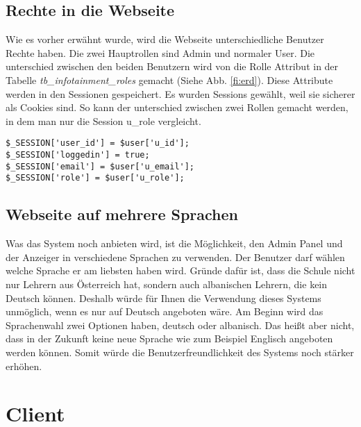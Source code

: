 \subsection{Rechte in die Webseite}
Wie es vorher erwähnt wurde, wird die Webseite unterschiedliche Benutzer Rechte haben. Die zwei Hauptrollen sind Admin und normaler User. Die unterschied zwischen den beiden Benutzern wird von die Rolle Attribut in der Tabelle \textit{tb\_infotainment\_roles} gemacht (Siehe Abb. \ref{fi:erd}). Diese Attribute werden in den Sessionen gespeichert. Es wurden Sessions gewählt, weil sie sicherer als Cookies sind.\cite{40_sessions_cookies} So kann der unterschied zwischen zwei Rollen gemacht werden, in dem man nur die Session u\_role vergleicht.
\begin{lstlisting}[frame=single]
$_SESSION['user_id'] = $user['u_id'];
$_SESSION['loggedin'] = true;
$_SESSION['email'] = $user['u_email'];
$_SESSION['role'] = $user['u_role'];
\end{lstlisting}


\subsection{Webseite auf mehrere Sprachen}

Was das System noch anbieten wird, ist die Möglichkeit, den Admin Panel und der Anzeiger in verschiedene Sprachen zu verwenden. Der Benutzer darf wählen welche Sprache er am liebsten haben wird. Gründe dafür ist, dass die Schule nicht nur Lehrern aus Österreich hat, sondern auch albanischen Lehrern, die kein Deutsch können. Deshalb würde für Ihnen die Verwendung dieses Systems unmöglich, wenn es nur auf Deutsch angeboten wäre. Am Beginn wird das Sprachenwahl zwei Optionen haben, deutsch oder albanisch. Das heißt aber nicht, dass in der Zukunft keine neue Sprache wie zum Beispiel Englisch angeboten werden können. Somit würde die Benutzerfreundlichkeit des Systems noch stärker erhöhen.

\section{Client}

